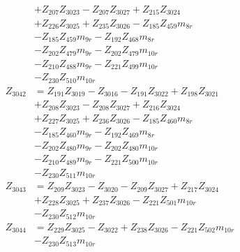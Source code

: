 \begin{multicols}{2}
\begin{align}
&+ Z_{207}Z_{3023} - Z_{207}Z_{3027} + Z_{215}Z_{3024}  \nonumber \\
&+ Z_{226}Z_{3025} + Z_{235}Z_{3026} - Z_{185}Z_{459}m_{8r}  \nonumber \\
&- Z_{185}Z_{459}m_{9r} - Z_{192}Z_{468}m_{8r}  \nonumber \\
&- Z_{202}Z_{479}m_{9r} - Z_{202}Z_{479}m_{10r}  \nonumber \\
&- Z_{210}Z_{488}m_{9r} - Z_{221}Z_{499}m_{10r}  \nonumber \\
&- Z_{230}Z_{510}m_{10r} \nonumber \\
Z_{3042} &= Z_{191}Z_{3019} - Z_{3016} - Z_{191}Z_{3022} + Z_{198}Z_{3021}  \nonumber \\
&+ Z_{208}Z_{3023} - Z_{208}Z_{3027} + Z_{216}Z_{3024}  \nonumber \\
&+ Z_{227}Z_{3025} + Z_{236}Z_{3026} - Z_{185}Z_{460}m_{8r}  \nonumber \\
&- Z_{185}Z_{460}m_{9r} - Z_{192}Z_{469}m_{8r}  \nonumber \\
&- Z_{202}Z_{480}m_{9r} - Z_{202}Z_{480}m_{10r}  \nonumber \\
&- Z_{210}Z_{489}m_{9r} - Z_{221}Z_{500}m_{10r}  \nonumber \\
&- Z_{230}Z_{511}m_{10r} \nonumber \\
Z_{3043} &= Z_{209}Z_{3023} - Z_{3020} - Z_{209}Z_{3027} + Z_{217}Z_{3024}  \nonumber \\
&+ Z_{228}Z_{3025} + Z_{237}Z_{3026} - Z_{221}Z_{501}m_{10r}  \nonumber \\
&- Z_{230}Z_{512}m_{10r} \nonumber \\
Z_{3044} &= Z_{229}Z_{3025} - Z_{3022} + Z_{238}Z_{3026} - Z_{221}Z_{502}m_{10r}  \nonumber \\
&- Z_{230}Z_{513}m_{10r} \nonumber \\
\end{align}
\end{multicols}
